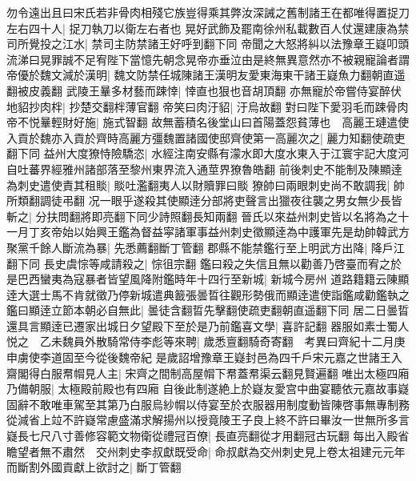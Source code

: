 勿令遠出且曰宋氏若非骨肉相殘它族豈得乘其弊汝深誡之舊制諸王在都唯得置捉刀左右四十人|{
	捉刀執刀以衛左右者也}
晃好武飾及罷南徐州私載數百人仗還建康為禁司所覺投之江水|{
	禁司主防禁諸王好呼到翻下同}
帝聞之大怒將糾以法豫章王嶷叩頭流涕曰晃罪誠不足宥陛下當憶先朝念晃帝亦垂泣由是終無異意然亦不被親寵論者謂帝優於魏文減於漢明|{
	魏文防禁任城陳諸王漢明友愛東海東干諸王嶷魚力翻朝直遥翻被皮義翻}
武陵王曅多材藝而踈悻|{
	悻直也狠也音胡頂翻}
亦無寵於帝嘗侍宴醉伏地貂抄肉柈|{
	抄楚交翻柈薄官翻}
帝笑曰肉汙貂|{
	汙烏故翻}
對曰陛下愛羽毛而踈骨肉帝不悦曅輕財好施|{
	施式智翻}
故無蓄積名後堂山曰首陽蓋怨貧薄也　高麗王璉遣使入貢於魏亦入貢於齊時高麗方彊魏置諸國使邸齊使第一高麗次之|{
	麗力知翻使疏吏翻下同}
益州大度獠恃險驕恣|{
	水經注南安縣有濛水即大度水東入于江寰宇記大度河自吐蕃界經雅州諸部落至黎州東界流入通莖界獠魯皓翻}
前後刺史不能制及陳顯逹為刺史遣使責其租賧|{
	賧吐濫翻夷人以財贖罪曰賧}
獠帥曰兩眼刺史尚不敢調我|{
	帥所類翻調徒弔翻}
况一眼乎遂殺其使顯逹分部將吏聲言出獵夜往襲之男女無少長皆斬之|{
	分扶問翻將即亮翻下同少詩照翻長知兩翻}
晉氏以來益州刺史皆以名將為之十一月丁亥帝始以始興王鑑為督益寜諸軍事益州刺史徵顯逹為中護軍先是劫帥韓武方聚黨千餘人斷流為暴|{
	先悉薦翻斷丁管翻}
郡縣不能禁鑑行至上明武方出降|{
	降戶江翻下同}
長史虞悰等咸請殺之|{
	悰徂宗翻}
鑑曰殺之失信且無以勸善乃啓臺而宥之於是巴西蠻夷為寇暴者皆望風降附鑑時年十四行至新城|{
	新城今房州}
道路籍籍云陳顯逹大選士馬不肯就徵乃停新城遣典籖張曇晢往觀形勢俄而顯逹遣使詣鑑咸勸鑑執之鑑曰顯逹立節本朝必自無此|{
	曇徒含翻晢先擊翻使疏吏翻朝直遥翻下同}
居二日曇晢還具言顯逹已遷家出城日夕望殿下至於是乃前鑑喜文學|{
	喜許記翻}
器服如素士蜀人悦之　乙未魏員外散騎常侍李彪等來聘|{
	歲悉亶翻騎奇寄翻　考異曰齊紀十二月庚申虜使李道固至今從後魏帝紀}
是歲詔增豫章王嶷封邑為四千戶宋元嘉之世諸王入齋閣得白服帬㡌見人主|{
	宋齊之間制高屋㡌下帬蓋帬渠云翻見賢遍翻}
唯出太極四廂乃備朝服|{
	太極殿前殿也有四廂}
自後此制遂絶上於嶷友愛宫中曲宴聽依元嘉故事嶷固辭不敢唯車駕至其第乃白服烏紗㡌以侍宴至於衣服器用制度動皆陳啓事無專制務從減省上竝不許嶷常慮盛滿求解揚州以授竟陵王子良上終不許曰畢汝一世無所多言嶷長七尺八寸善修容範文物衛從禮冠百僚|{
	長直亮翻從才用翻冠古玩翻}
每出入殿省瞻望者無不肅然　交州刺史李叔獻既受命|{
	命叔獻為交州刺史見上卷太祖建元元年}
而斷割外國貢獻上欲討之|{
	斷丁管翻}


